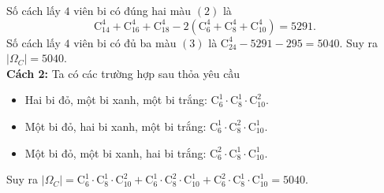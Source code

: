 \begin{vd}
{\begin{enumerate}
\begin{itemize}
Số cách lấy $4$ viên bi có đúng hai màu $(2)$ là $$\mathrm{C}^4_{14}+\mathrm{C}^4_{16}+\mathrm{C}^4_{18}-2\left(\mathrm{C}^4_6+\mathrm{C}^4_8+\mathrm{C}^4_{10}\right)=5291.$$
Số cách lấy $4$ viên bi có đủ ba màu $(3)$ là $\mathrm{C}^4_{24}-5291-295=5040$.
Suy ra $|{\Omega}_C|=5040$.\\
\textbf{Cách 2:} Ta có các trường hợp sau thỏa yêu cầu
\begin{itemize}
\item Hai bi đỏ, một bi xanh, một bi trắng: $\mathrm{C}_6^1\cdot\mathrm{C}_8^1\cdot\mathrm{C}_{10}^2$.
\item Một bi đỏ, hai bi xanh, một bi trắng: $\mathrm{C}_6^1\cdot\mathrm{C}_8^2\cdot\mathrm{C}_{10}^1$.
\item Một bi đỏ, một bi xanh, hai bi trắng: $\mathrm{C}_6^2\cdot\mathrm{C}_8^1\cdot\mathrm{C}_{10}^1$.
\end{itemize}
Suy ra $|{\Omega}_C|=\mathrm{C}_6^1\cdot\mathrm{C}_8^1\cdot\mathrm{C}_{10}^2+\mathrm{C}_6^1\cdot\mathrm{C}_8^2\cdot\mathrm{C}_{10}^1+\mathrm{C}_6^2\cdot\mathrm{C}_8^1\cdot\mathrm{C}_{10}^1=5040$.
\end{itemize}
\end{enumerate}
	}
\end{vd}

